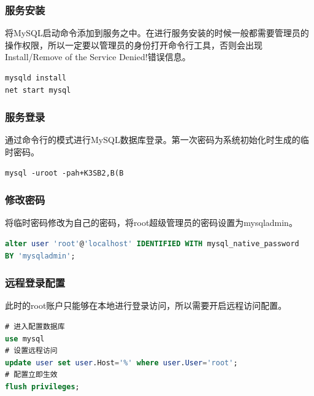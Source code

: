 \documentclass[12pt, openany, oneside]{book}
\begin{document}
\subsubsection{服务安装}

将MySQL启动命令添加到服务之中。在进行服务安装的时候一般都需要管理员的操作权限，所以一定要以管理员的身份打开命令行工具，否则会出现Install/Remove of the Service Denied!错误信息。\\


\begin{lstlisting}
mysqld install
net start mysql
\end{lstlisting}

\subsubsection{服务登录}

通过命令行的模式进行MySQL数据库登录。第一次密码为系统初始化时生成的临时密码。\\


\begin{lstlisting}
mysql -uroot -pah+K3SB2,B(B
\end{lstlisting}

\subsubsection{修改密码}

将临时密码修改为自己的密码，将root超级管理员的密码设置为mysqladmin。\\


\begin{lstlisting}[language=SQL]
alter user 'root'@'localhost' IDENTIFIED WITH mysql_native_password
BY 'mysqladmin';
\end{lstlisting}

\subsubsection{远程登录配置}

此时的root账户只能够在本地进行登录访问，所以需要开启远程访问配置。\\


\begin{lstlisting}[language=SQL]
# 进入配置数据库
use mysql
# 设置远程访问
update user set user.Host='%' where user.User='root';
# 配置立即生效
flush privileges;
\end{lstlisting}
\end{document}
